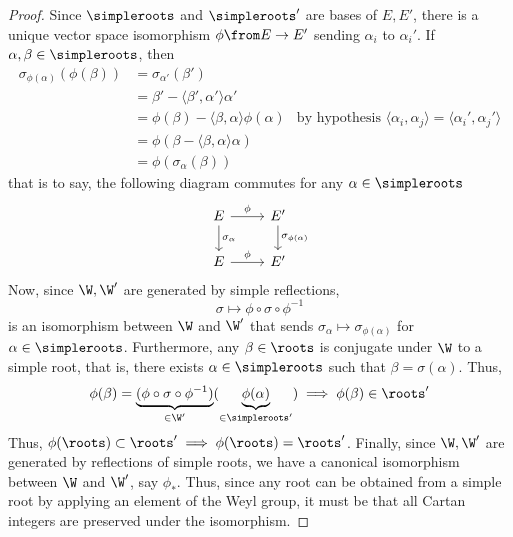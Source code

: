\documentclass[11pt,leqno,oneside]{amsart}
\numberwithin{thm}{section}
\begin{document}
\begin{proof}
  Since \(\simpleroots\) and \(\simpleroots'\) are bases of \(E,E'\),
  there is a unique vector space isomorphism \(\phi \from E \to E'\)
  sending \(\alpha_i\) to \(\alpha_i'\). If \(\alpha,\beta \in
  \simpleroots\), then
  \begin{align*}
    \sigma_{\phi(\alpha)}(\phi(\beta))
    & = \sigma_{\alpha'}(\beta') \\
    & = \beta' - \langle \beta',\alpha' \rangle \alpha' \\
    & = \phi(\beta) - \langle \beta, \alpha \rangle \phi(\alpha)
    & \text{by hypothesis }\langle \alpha_i, \alpha_j \rangle =
      \langle \alpha_i', \alpha_j' \rangle \\
    & = \phi(\beta-\langle \beta, \alpha \rangle \alpha) \\
    & = \phi(\sigma_\alpha(\beta))
  \end{align*}
  that is to say, the following diagram commutes for any \(\alpha \in
  \simpleroots\)
  \[
    \begin{tikzcd}
    E \ar[d, "\sigma_\alpha"]\ar[r, "\phi"] & E' \ar[d,
    "\sigma_{\phi(\alpha)}"] \\ 
    E \ar[r, "\phi"] & E'
  \end{tikzcd}
  \]
  Now, since \(\W,\W'\) are generated by simple reflections, \[
    \sigma \mapsto \phi \circ \sigma \circ \phi^{-1}
  \]
  is an isomorphism between \(\W\) and \(\W'\) that sends
  \(\sigma_\alpha \mapsto \sigma_{\phi(\alpha)}\) for \(\alpha \in
  \simpleroots\). Furthermore, any \(\beta \in \roots\) is conjugate
  under \(\W\) to a simple root, that is, there exists \(\alpha \in
  \simpleroots\) such that \(\beta = \sigma(\alpha)\). Thus, \[
    \phi(\beta) = \underbrace{(\phi \circ \sigma \circ
      \phi^{-1})}_{\in \W'}(\underbrace{\phi(\alpha)}_{\in \simpleroots'})
    \implies \phi(\beta) \in \roots'
  \]
  Thus, \(\phi(\roots) \subset
  \roots' \implies \phi(\roots) = \roots'\). Finally, since \(\W,
  \W'\) are generated by reflections of simple roots, we have a
  canonical isomorphism between \(\W\) and \(\W'\), say
  \(\phi_*\). Thus, since any 
  root can be obtained from a simple root by applying an element of
  the Weyl group, it must be that all Cartan integers are preserved
  under the isomorphism.
\end{proof}
\end{document}

